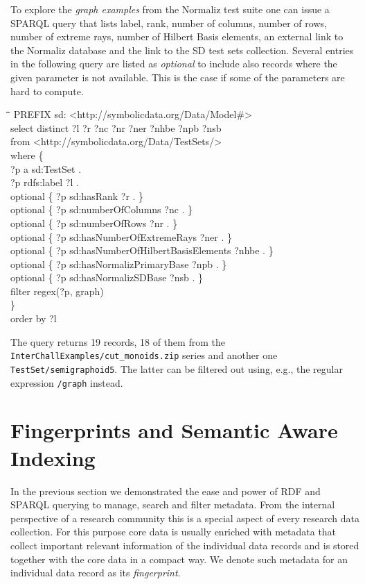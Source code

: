 \documentclass{mathincs}
\newenvironment{code}{\par\tt\begin{tabbing}
\hskip12pt\=\hskip12pt\=\hskip12pt\=\hskip12pt\=\hskip5cm\=\hskip5cm\=\kill}
{\end{tabbing}\normalsize}
\newcommand{\dq}{{\char34}} %
\begin{document}
To explore the \emph{graph examples} from the Normaliz test suite one can issue
a SPARQL query that lists label, rank, number of columns, number of rows,
number of extreme rays, number of Hilbert Basis elements, an external link to
the Normaliz database and the link to the SD test sets collection.  Several
entries in the following query are listed as \emph{optional} to include also
records where the given parameter is not available. This is the case if some of
the parameters are hard to compute.
\begin{code}
 PREFIX sd: <http://symbolicdata.org/Data/Model\#>\\
 select distinct ?l ?r ?nc ?nr ?ner ?nhbe ?npb ?nsb\\
 from <http://symbolicdata.org/Data/TestSets/>\\
 where \{\+\\
 ?p a sd:TestSet . \\
 ?p rdfs:label ?l . \\
 optional \{ ?p sd:hasRank ?r . \}	\\
 optional \{ ?p sd:numberOfColumns ?nc . \}\\		
 optional \{ ?p sd:numberOfRows ?nr . \}	\\
 optional \{ ?p sd:hasNumberOfExtremeRays ?ner . \}\\		
 optional \{ ?p sd:hasNumberOfHilbertBasisElements ?nhbe . \}\\		
 optional \{ ?p sd:hasNormalizPrimaryBase ?npb . \}\\
 optional \{ ?p sd:hasNormalizSDBase ?nsb . \}\\
 filter regex(?p, {\dq}graph{\dq})\-\\
 \}\\
 order by ?l
\end{code}
The query returns 19 records, 18 of them from the
\texttt{InterChallExamples/cut\_monoids.zip} series and another one
\texttt{TestSet/semigraphoid5}. The latter can be filtered out using, e.g., the
regular expression \texttt{{\dq}/graph{\dq}} instead.

\section{Fingerprints and Semantic Aware Indexing}

In the previous section we demonstrated the ease and power of RDF and SPARQL
querying to manage, search and filter metadata.  From the internal perspective
of a research community this is a special aspect of every research data
collection. For this purpose core data is usually enriched with metadata that
collect important relevant information of the individual data records and is
stored together with the core data in a compact way.  We denote such metadata
for an individual data record as its \emph{fingerprint}.
\end{document}
